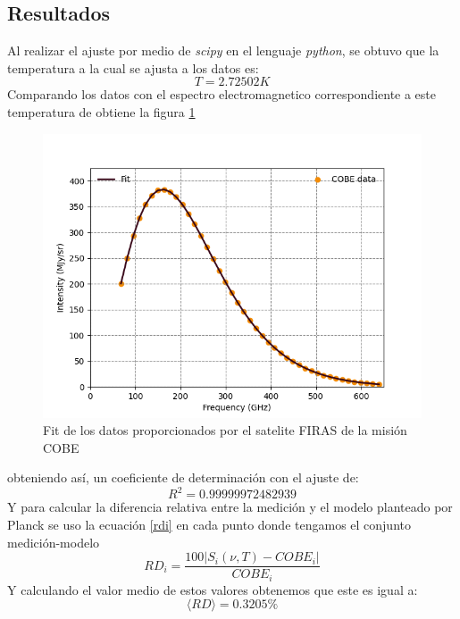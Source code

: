 \documentclass[12pt,letterpaper]{article}
\begin{document}
\begin{multicols}{2}
\section*{Resultados}
Al realizar el ajuste por medio de \textit{scipy} en el lenguaje  \textit{python}, se obtuvo que la temperatura a la cual se ajusta a los datos es:
\begin{equation*}
    T=2.72502K
\end{equation*}
Comparando los datos con el espectro electromagnetico correspondiente a este temperatura de obtiene la figura \ref{fit}
\begin{figure}[H]
\includegraphics[scale=0.45]{../Graphics/fit.png}
\caption{Fit de los datos proporcionados por el satelite FIRAS de la misión COBE}
\label{fit}
\end{figure}
obteniendo así, un coeficiente de determinación con el ajuste de:
\begin{equation*}
R^2=0.99999972482939
\label{coef_deter}
\end{equation*}
Y para calcular la diferencia relativa entre la medición y el modelo planteado por Planck se uso la ecuación \ref{rdi} en cada punto donde tengamos el conjunto medición-modelo
\begin{equation}
    RD_i = \frac{100|S_i(\nu,T)-COBE_i|}{COBE_i}
    \label{rdi}
\end{equation}
Y calculando el valor medio de estos valores obtenemos que este es igual a:
\begin{equation*}
    \langle RD \rangle = 0.3205\%
\end{equation*}
\begin{figure}[H]

\end{figure}
\end{multicols}
\end{document}
